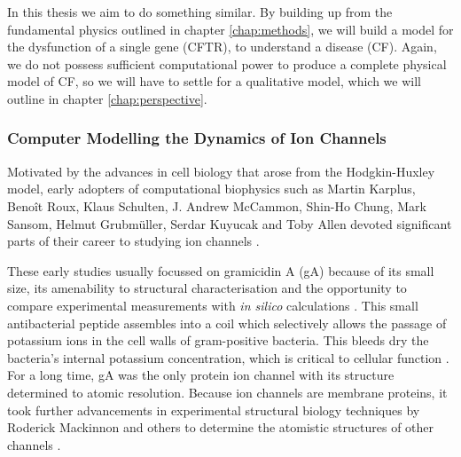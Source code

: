 In this thesis we aim to do something similar. By building up from the fundamental physics outlined in chapter \ref{chap:methods}, we will build a model for the dysfunction of a single gene (CFTR), to understand a disease (CF). Again, we do not possess sufficient computational power to produce a complete physical model of CF, so we will have to settle for a qualitative model, which we will outline in chapter \ref{chap:perspective}. 


\subsubsection{Computer Modelling the Dynamics of Ion Channels}
Motivated by the advances in cell biology that arose from the Hodgkin-Huxley model, early adopters of computational biophysics such as Martin Karplus, Beno\^it Roux, Klaus Schulten, J. Andrew McCammon, Shin-Ho Chung, Mark Sansom, Helmut Grubm\"uller, Serdar Kuyucak and Toby Allen devoted significant parts of their career to studying ion channels \cite{mccammon1977, sansom1991, roux1991, roux1993, sansom1991, tajkhorshid2002, degroot2001, allen2003, allen2004, chung2002, tieleman2001}. 

These early studies usually focussed on gramicidin A (gA) because of its small size, its amenability to structural characterisation and the opportunity to compare experimental measurements with \textit{in silico} calculations \cite{urry1971,arseniev1985,wallace1986,wallace1998}. This small antibacterial peptide assembles into a coil which selectively allows the passage of potassium ions in the cell walls of gram-positive bacteria. This bleeds dry the bacteria's internal potassium concentration, which is critical to cellular function \cite{liou2015}. For a long time, gA was the only protein ion channel with its structure determined to atomic resolution. Because ion channels are membrane proteins, it took further advancements in experimental structural biology techniques by Roderick Mackinnon and others to determine the atomistic structures of other channels \cite{kuhlbrandt2014, clapham2003, doyle1998}. 


